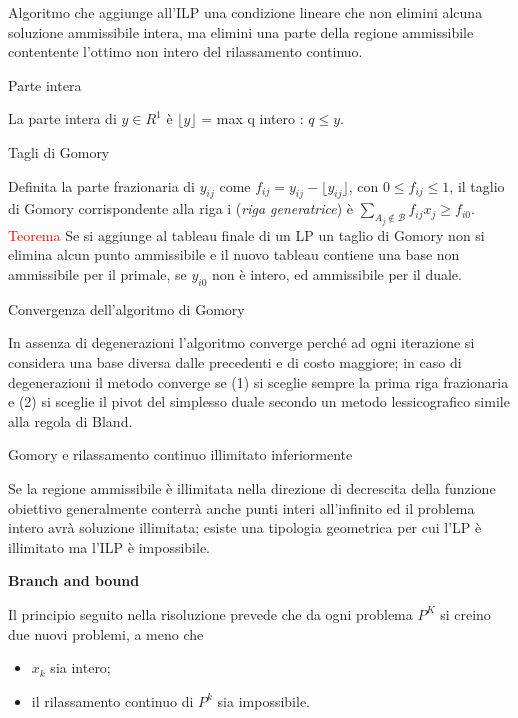 \documentclass[answers, a4paper, 11pt]{exam}
\begin{document}
\begin{questions}
\begin{solution}
Algoritmo che aggiunge all'ILP una condizione lineare che non elimini alcuna soluzione ammissibile intera, ma elimini una parte della regione ammissibile contentente l'ottimo non intero del rilassamento continuo.
\end{solution}
\question Parte intera
\begin{solution}
La parte intera di $y \in R^{1}$ è $\lfloor y \rfloor$ = max q intero : $q \le y$.
\end{solution}
\question Tagli di Gomory
\begin{solution}
Definita la parte frazionaria di $y_{ij}$ come $f_{ij} = y_{ij} - \lfloor y_{ij} \rfloor$, con $0 \le f_{ij} \le 1$, il taglio di Gomory corrispondente alla riga i (\emph{riga generatrice}) è $\sum_{A_{j}\notin \mathcal{B}} f_{ij}x_{j} \ge f_{i0}$.\\
\textcolor{red}{Teorema} Se si aggiunge al tableau finale di un LP un taglio di Gomory non si elimina alcun punto ammissibile e il nuovo tableau contiene una base non ammissibile per il primale, se $y_{i0}$ non è intero, ed ammissibile per il duale.
\end{solution}
\question Convergenza dell'algoritmo di Gomory
\begin{solution}
In assenza di degenerazioni l'algoritmo converge perché ad ogni iterazione si considera una base diversa dalle precedenti e di costo maggiore; in caso di degenerazioni il metodo converge se (1) si sceglie sempre la prima riga frazionaria e (2) si sceglie il pivot del simplesso duale secondo un metodo lessicografico simile alla regola di Bland.
\end{solution}
\question Gomory e rilassamento continuo illimitato inferiormente
\begin{solution}
Se la regione ammissibile è illimitata nella direzione di decrescita della funzione obiettivo generalmente conterrà anche punti interi all'infinito ed il problema intero avrà soluzione illimitata; esiste una tipologia geometrica per cui l'LP è illimitato ma l'ILP è impossibile.
\end{solution}
\question \textbf{Branch and bound}
\begin{solution}
Il principio seguito nella risoluzione prevede che da ogni problema $P^{K}$ si creino due nuovi problemi, a meno che 
\begin{itemize}
\item $x_{k}$ sia intero;
\item il rilassamento continuo di $P^{k}$ sia impossibile.
\end{itemize}

\end{solution}
\end{questions}
\end{document}
